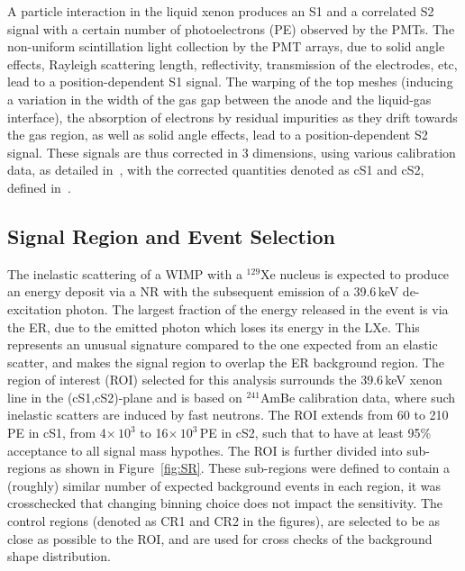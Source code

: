 A particle interaction in the liquid xenon produces an S1 and a correlated S2 signal with a certain number of photoelectrons (PE) observed by the PMTs. The non-uniform scintillation light collection by the PMT arrays, due to solid angle effects, Rayleigh scattering length, reflectivity, transmission of the electrodes, etc, lead to a position-dependent S1 signal. The warping of the top meshes (inducing a variation in the width of the gas gap between the anode and the liquid-gas interface), the absorption of electrons by residual impurities as they drift towards the gas region, as well as solid angle effects, lead to a position-dependent S2 signal. These signals are thus corrected in 3 dimensions, using various calibration data, as detailed in~\cite{Aprile:2011dd,Aprile:2012vw}, with the corrected quantities denoted as cS1 and cS2, defined in~\cite{Aprile:2012vw}. 

\subsection{Signal Region and Event Selection} 

The inelastic scattering of a WIMP with a $^{129}$Xe nucleus is expected to produce an energy deposit via a NR with the subsequent emission of  
a 39.6\,keV de-excitation photon. The largest fraction of the energy released in the event is via the ER, due to the emitted photon which loses its energy in the LXe.
This represents an unusual signature compared to the one expected from an elastic scatter, and makes the signal region to overlap the ER background region.
The region of interest (ROI) selected for this analysis surrounds the 39.6\,keV xenon line in the (cS1,cS2)-plane 
and is based on $^{241}$AmBe calibration data, where such inelastic scatters are induced by fast neutrons. The ROI extends from 60 to 210\,PE in cS1, from 4$\times \, 10^3$ to 16$\times \, 10^3$\,PE in cS2,
{\ale such that to have at least 95\% acceptance to all signal mass hypothes. The ROI }
is further divided  into sub-regions as shown in Figure~\ref{fig:SR}.  These sub-regions were defined to  contain a (roughly) similar number of expected background events in each region, 
{\ale it was crosschecked that changing binning choice does not impact the sensitivity.} 
The control regions (denoted as CR1 and CR2 in the figures), are selected to be as close as possible to the ROI,  and are used for cross checks of the background shape distribution.

